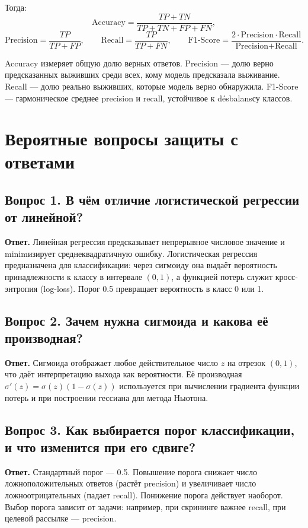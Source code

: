 \documentclass[12pt,a4paper]{article}
\begin{document}
Тогда:
\begin{equation}
\text{Accuracy} = \frac{TP+TN}{TP+TN+FP+FN},
\end{equation}
\begin{equation}
\text{Precision} = \frac{TP}{TP+FP}, \qquad
\text{Recall} = \frac{TP}{TP+FN}, \qquad
\text{F1-Score} = \frac{2 \cdot \text{Precision} \cdot \text{Recall}}{\text{Precision} + \text{Recall}}.
\end{equation}

Accuracy измеряет общую долю верных ответов. Precision --- долю верно предсказанных выживших среди всех, кому модель предсказала выживание. Recall --- долю реально выживших, которые модель верно обнаружила. F1-Score --- гармоническое среднее precision и recall, устойчивое к désbalansсу классов.

\section{Вероятные вопросы защиты с ответами}

\subsection*{Вопрос 1. В чём отличие логистической регрессии от линейной?}
\textbf{Ответ.} Линейная регрессия предсказывает непрерывное числовое значение и minimизирует среднеквадратичную ошибку. Логистическая регрессия предназначена для классификации: через сигмоиду она выдаёт вероятность принадлежности к классу в интервале \((0,1)\), а функцией потерь служит кросс-энтропия (log-loss). Порог 0.5 превращает вероятность в класс 0 или 1.

\subsection*{Вопрос 2. Зачем нужна сигмоида и какова её производная?}
\textbf{Ответ.} Сигмоида отображает любое действительное число \(z\) на отрезок \((0,1)\), что даёт интерпретацию выхода как вероятности. Её производная \(\sigma'(z) = \sigma(z)(1-\sigma(z))\) используется при вычислении градиента функции потерь и при построении гессиана для метода Ньютона.

\subsection*{Вопрос 3. Как выбирается порог классификации, и что изменится при его сдвиге?}
\textbf{Ответ.} Стандартный порог --- 0.5. Повышение порога снижает число ложноположительных ответов (растёт precision) и увеличивает число ложноотрицательных (падает recall). Понижение порога действует наоборот. Выбор порога зависит от задачи: например, при скрининге важнее recall, при целевой рассылке --- precision.
\end{document}
